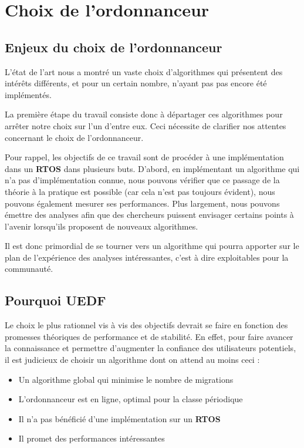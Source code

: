 \section{Choix de l'ordonnanceur}

	\subsection{Enjeux du choix de l'ordonnanceur}

	L'état de l'art nous a montré un vaste choix d'algorithmes qui présentent 
	des intérêts différents, et pour un certain nombre, 
	n'ayant pas pas encore été implémentés. \newline
	
	La première étape du travail consiste donc à départager ces algorithmes pour arrêter notre choix sur l'un d'entre eux. Ceci nécessite de clarifier nos attentes concernant le choix de l'ordonnanceur.\newline
	
	Pour rappel, les objectifs de ce travail sont de procéder à une implémentation dans 
	un \textbf{RTOS} dans plusieurs buts. 
	D'abord, en implémentant un algorithme qui n'a pas d'implémentation connue, nous 
	pouvons vérifier que ce passage de la théorie à la pratique est possible (car cela n'est pas 
	toujours évident), nous pouvons également mesurer ses performances. 
	Plus largement, nous pouvons émettre des analyses afin que des chercheurs puissent envisager certains points à l'avenir 
	lorsqu'ils proposent de nouveaux algorithmes. \newline
	
	Il est donc primordial de se tourner vers un algorithme qui pourra apporter sur le plan de 
	l'expérience des analyses intéressantes, c'est à dire exploitables pour la communauté.\newline
	
	

	\subsection{Pourquoi UEDF}
	
	Le choix le plus rationnel vis à vis des objectifs devrait se faire en fonction des 
	promesses théoriques de performance et de stabilité. 
	En effet, pour faire avancer la connaissance et permettre d'augmenter la confiance des utilisateurs 
	potentiels, il est judicieux de choisir un algorithme dont on attend au moins ceci :
	\begin{itemize}
		\item Un algorithme global qui minimise le nombre de migrations
		\item L'ordonnanceur est en ligne, optimal pour la classe périodique
		\item Il n'a pas bénéficié d'une implémentation sur un \textbf{RTOS}
		\item Il promet des performances intéressantes
	\end{itemize}
	
